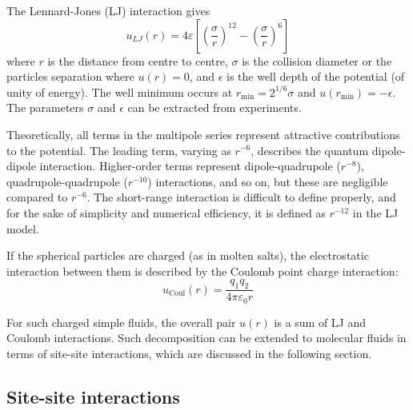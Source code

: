 The Lennard-Jones (LJ) interaction gives
\begin{equation}
u_{LJ}(r)=4\varepsilon\left[\left(\frac{\sigma}{r}\right)^{12}-\left(\frac{\sigma}{r}\right)^{6}\right]
\end{equation}
where $r$ is the distance from centre to centre, $\sigma$ is the
collision diameter or the particles separation where $u(r)=0$, and
$\epsilon$ is the well depth of the potential (of unity of energy).
The well minimum occurs at $r_{\min}=2^{1/6}\sigma$ and $u(r_{\min})=-\epsilon$.
The parameters $\sigma$ and $\epsilon$ can be extracted from experiments.

Theoretically, all terms in the multipole series represent attractive
contributions to the potential. The leading term, varying as $r^{-6}$,
describes the quantum dipole-dipole interaction. Higher-order terms
represent dipole-quadrupole ($r^{-8}$), quadrupole-quadrupole ($r^{-10}$)
interactions, and so on, but these are negligible compared to $r^{-6}$.
The short-range interaction is difficult to define properly, and for
the sake of simplicity and numerical efficiency, it is defined as
$r^{-12}$ in the LJ model. 

If the spherical particles are charged (as in molten salts), the electrostatic
interaction between them is described by the Coulomb point charge
interaction:
\begin{equation}
u_{\mathrm{Coul}}(r)=\frac{q_{1}q_{2}}{4\pi\varepsilon_{0}r}
\end{equation}

For such charged simple fluids, the overall pair $u(r)$ is a sum
of LJ and Coulomb interactions. Such decomposition can be extended
to molecular fluids in terms of site-site interactions, which are
discussed in the following section.

\subsection{Site-site interactions}

